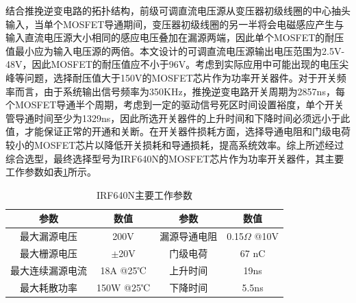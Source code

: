结合推挽逆变电路的拓扑结构，前级可调直流电压源从变压器初级线圈的中心抽头输入，当单个MOSFET导通期间，变压器初级线圈的另一半将会电磁感应产生与输入直流电压源大小相同的感应电压叠加在漏源两端，因此单个MOSFET的耐压值最小应为输入电压源的两倍。本文设计的可调直流电压源输出电压范围为2.5V-48V，因此MOSFET的耐压值应不小于96V。考虑到实际应用中可能出现的电压尖峰等问题，选择耐压值大于150V的MOSFET芯片作为功率开关器件。对于开关频率而言，由于系统输出信号频率为350KHz，推挽逆变电路开关周期为2857ns，每个MOSFET导通半个周期，考虑到一定的驱动信号死区时间设置裕度，单个开关管导通时间至少为1329ns，因此所选开关器件的上升时间和下降时间必须远小于此值，才能保证正常的开通和关断。在开关器件损耗方面，选择导通电阻和门级电荷较小的MOSFET芯片以降低开关损耗和导通损耗，提高系统效率。综上所述经过综合选型，最终选择型号为IRF640N的MOSFET芯片作为功率开关器件，其主要工作参数如表\ref{IRF640N}所示。
\begin{table}[htbp]
	\caption{\label{IRF640N}IRF640N主要工作参数}
	\centering
	\small
	\setlength{\tabcolsep}{20pt}
	\begin{tabular}{c c c c }
		\hline
		参数       & 数值        & 参数     & 数值                \\
		\hline
		最大漏源电压   & 200V      & 漏源导通电阻 & 0.15$\Omega$ @10V \\
		最大栅源电压   & $\pm$20V  & 门级电荷   & 67 nC             \\
		最大连续漏源电流 & 18A @25℃  & 上升时间   & 19ns              \\
		最大耗散功率   & 150W @25℃ & 下降时间   & 5.5ns             \\
		\hline
	\end{tabular}
\end{table}

